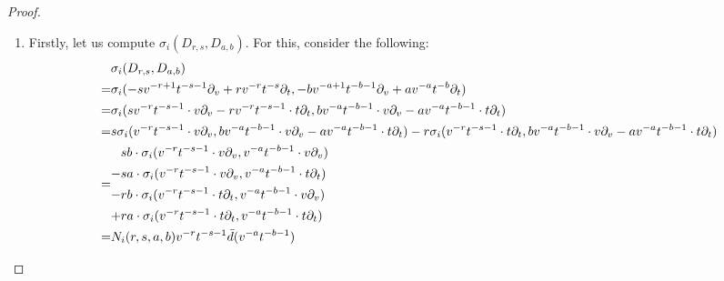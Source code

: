             \begin{proof}
                \begin{enumerate}
                    \item Firstly, let us compute $\sigma_i(D_{r, s}, D_{a, b})$. For this, consider the following:
                        $$
                            \begin{aligned}
                                & \sigma_i(D_{r, s}, D_{a, b})
                                \\
                                = & \sigma_i( -s v^{-r + 1} t^{-s - 1} \partial_v + r v^{-r} t^{-s} \partial_t, -b v^{-a + 1} t^{-b - 1} \partial_v + a v^{-a} t^{-b} \partial_t )
                                \\
                                = & \sigma_i( s v^{-r} t^{-s - 1} \cdot v\partial_v - r v^{-r} t^{-s - 1} \cdot t \partial_t, b v^{-a} t^{-b - 1} \cdot v\partial_v - a v^{-a} t^{-b - 1} \cdot t \partial_t )
                                \\
                                = & s \sigma_i( v^{-r} t^{-s - 1} \cdot v\partial_v, b v^{-a} t^{-b - 1} \cdot v\partial_v - a v^{-a} t^{-b - 1} \cdot t \partial_t ) - r \sigma_i( v^{-r} t^{-s - 1} \cdot t \partial_t, b v^{-a} t^{-b - 1} \cdot v\partial_v - a v^{-a} t^{-b - 1} \cdot t \partial_t )
                                \\
                                = &
                                \begin{aligned}
                                    & s b \cdot \sigma_i( v^{-r} t^{-s - 1} \cdot v\partial_v, v^{-a} t^{-b - 1} \cdot v\partial_v )
                                    \\
                                    - & s a \cdot \sigma_i( v^{-r} t^{-s - 1} \cdot v\partial_v, v^{-a} t^{-b - 1} \cdot t \partial_t )
                                    \\
                                    - & r b \cdot \sigma_i( v^{-r} t^{-s - 1} \cdot t \partial_t, v^{-a} t^{-b - 1} \cdot v\partial_v )
                                    \\
                                    + & r a \cdot \sigma_i( v^{-r} t^{-s - 1} \cdot t \partial_t, v^{-a} t^{-b - 1} \cdot t \partial_t )
                                \end{aligned}
                                \\
                                = & N_i(r, s, a, b) v^{-r} t^{-s - 1} \bar{d}( v^{-a} t^{-b - 1} )
                            \end{aligned}
$$
\end{enumerate}
\end{proof}
